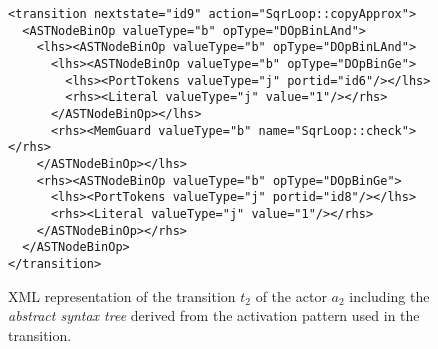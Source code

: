 \begin{figure}[h]
\begin{verbatim}
<transition nextstate="id9" action="SqrLoop::copyApprox">
  <ASTNodeBinOp valueType="b" opType="DOpBinLAnd">
    <lhs><ASTNodeBinOp valueType="b" opType="DOpBinLAnd">
      <lhs><ASTNodeBinOp valueType="b" opType="DOpBinGe">
        <lhs><PortTokens valueType="j" portid="id6"/></lhs>
        <rhs><Literal valueType="j" value="1"/></rhs>
      </ASTNodeBinOp></lhs>
      <rhs><MemGuard valueType="b" name="SqrLoop::check"></rhs>
    </ASTNodeBinOp></lhs>
    <rhs><ASTNodeBinOp valueType="b" opType="DOpBinGe">
      <lhs><PortTokens valueType="j" portid="id8"/></lhs>
      <rhs><Literal valueType="j" value="1"/></rhs>
    </ASTNodeBinOp></rhs>
  </ASTNodeBinOp>
</transition>
\end{verbatim}
\caption{\label{fig:xml-t2-sqrloop}%
XML representation of the transition $t_2$ of the  actor $a_2$ including the \emph{abstract syntax tree} derived from the activation pattern used in the transition.
}
\end{figure}

